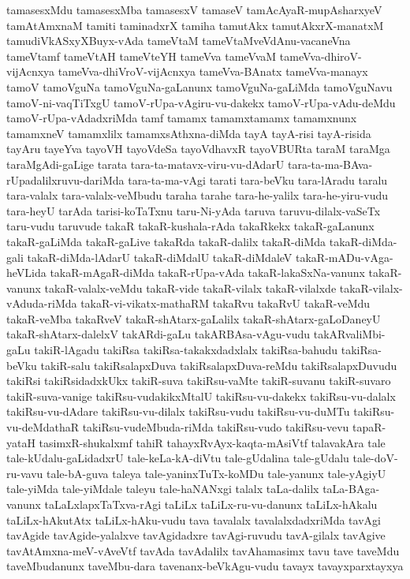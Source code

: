 {tamasesxMdu
tamasesxMba
tamasesxV
tamaseV
tamAcAyaR-mupAsharxyeV
tamAtAmxnaM
tamiti
taminadxrX
tamiha
tamutAkx
tamutAkxrX-manatxM
tamudiVkASxyXBuyx-vAda
tameVtaM
tameVtaMveVdAnu-vacaneVna
tameVtamf
tameVtAH
tameVteYH
tameVva
tameVvaM
tameVva-dhiroV-vijAcnxya
tameVva-dhiVroV-vijAcnxya
tameVva-BAnatx
tameVva-manayx
tamoV
tamoVguNa
tamoVguNa-gaLanunx
tamoVguNa-gaLiMda
tamoVguNavu
tamoV-ni-vaqTiTxgU
tamoV-rUpa-vAgiru-vu-dakekx
tamoV-rUpa-vAdu-deMdu
tamoV-rUpa-vAdadxriMda
tamf
tamamx
tamamxtamamx
tamamxnunx
tamamxneV
tamamxlilx
tamamxsAthxna-diMda
tayA
tayA-risi
tayA-risida
tayAru
tayeYva
tayoVH
tayoVdeSa
tayoVdhavxR
tayoVBURta
taraM
taraMga
taraMgAdi-gaLige
tarata
tara-ta-matavx-viru-vu-dAdarU
tara-ta-ma-BAva-rUpadalilxruvu-dariMda
tara-ta-ma-vAgi
tarati
tara-beVku
tara-lAradu
taralu
tara-valalx
tara-valalx-veMbudu
taraha
tarahe
tara-he-yalilx
tara-he-yiru-vudu
tara-heyU
tarAda
tarisi-koTaTxnu
taru-Ni-yAda
taruva
taruvu-dilalx-vaSeTx
taru-vudu
taruvude
takaR
takaR-kushala-rAda
takaRkekx
takaR-gaLanunx
takaR-gaLiMda
takaR-gaLive
takaRda
takaR-dalilx
takaR-diMda
takaR-diMda-gali
takaR-diMda-lAdarU
takaR-diMdalU
takaR-diMdaleV
takaR-mADu-vAga-heVLida
takaR-mAgaR-diMda
takaR-rUpa-vAda
takaR-lakaSxNa-vanunx
takaR-vanunx
takaR-valalx-veMdu
takaR-vide
takaR-vilalx
takaR-vilalxde
takaR-vilalx-vAduda-riMda
takaR-vi-vikatx-mathaRM
takaRvu
takaRvU
takaR-veMdu
takaR-veMba
takaRveV
takaR-shAtarx-gaLalilx
takaR-shAtarx-gaLoDaneyU
takaR-shAtarx-dalelxV
takARdi-gaLu
takARBAsa-vAgu-vudu
takARvaliMbi-gaLu
takiR-lAgadu
takiRsa
takiRsa-takakxdadxlalx
takiRsa-bahudu
takiRsa-beVku
takiR-salu
takiRsalapxDuva
takiRsalapxDuva-reMdu
takiRsalapxDuvudu
takiRsi
takiRsidadxkUkx
takiR-suva
takiRsu-vaMte
takiR-suvanu
takiR-suvaro
takiR-suva-vanige
takiRsu-vudakikxMtalU
takiRsu-vu-dakekx
takiRsu-vu-dalalx
takiRsu-vu-dAdare
takiRsu-vu-dilalx
takiRsu-vudu
takiRsu-vu-duMTu
takiRsu-vu-deMdathaR
takiRsu-vudeMbuda-riMda
takiRsu-vudo
takiRsu-vevu
tapaR-yataH
tasimxR-shukalxmf
tahiR
tahayxRvAyx-kaqta-mAsiVtf
talavakAra
tale
tale-kUdalu-gaLidadxrU
tale-keLa-kA-diVtu
tale-gUdalina
tale-gUdalu
tale-doV-ru-vavu
tale-bA-guva
taleya
tale-yaninxTuTx-koMDu
tale-yanunx
tale-yAgiyU
tale-yiMda
tale-yiMdale
taleyu
tale-haNANxgi
talalx
taLa-dalilx
taLa-BAga-vanunx
taLaLxlapxTaTxva-rAgi
taLiLx
taLiLx-ru-vu-danunx
taLiLx-hAkalu
taLiLx-hAkutAtx
taLiLx-hAku-vudu
tava
tavalalx
tavalalxdadxriMda
tavAgi
tavAgide
tavAgide-yalalxve
tavAgidadxre
tavAgi-ruvudu
tavA-gilalx
tavAgive
tavAtAmxna-meV-vAveVtf
tavAda
tavAdalilx
tavAhamasimx
tavu
tave
taveMdu
taveMbudanunx
taveMbu-dara
tavenanx-beVkAgu-vudu
tavayx
tavayxparxtayxya
}

